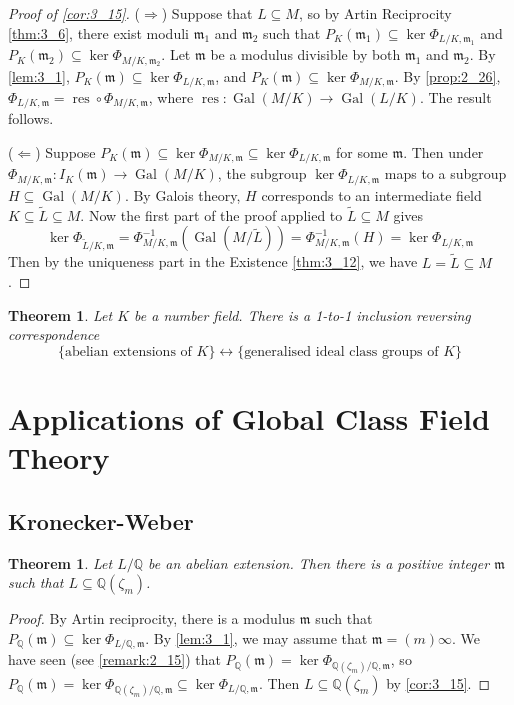 \documentclass[11pt]{article}
\theoremstyle{definition}
\theoremstyle{plain}
\newtheorem{theorem}[definition]{Theorem}
\theoremstyle{remark}
\DeclareMathOperator{\Gal}{Gal}
\DeclareMathOperator{\res}{res}
\newcommand{\QQ}{\mathbb{Q}}
\newcommand{\fm}{\mathfrak{m}}
\begin{document}
\begin{proof}[Proof of \autoref{cor:3_15}]\phantom{}

    ($\Rightarrow$) Suppose that $L \subseteq M$, so by Artin Reciprocity \autoref{thm:3_6}, there exist moduli $\fm_1$ and $\fm_2$ such that $P_K(\fm_1) \subseteq \ker \Phi_{L/K, \fm_1}$ and $P_K(\fm_2) \subseteq \ker \Phi_{M/K, \fm_2}$. Let $\fm$ be a modulus divisible by both $\fm_1$ and $\fm_2$. By \autoref{lem:3_1}, $P_K(\fm) \subseteq \ker \Phi_{L/K,\fm}$, and $P_K(\fm) \subseteq \ker \Phi_{M/K,\fm}$. By \autoref{prop:2_26}, $\Phi_{L/K, \fm} = \res \circ \Phi_{M/K, \fm}$, where $\res : \Gal(M/K) \to \Gal(L/K)$. The result follows.

    ($\Leftarrow$) Suppose $P_K(\fm) \subseteq \ker \Phi_{M/K, \fm} \subseteq \ker \Phi_{L/K, \fm}$ for some $\fm$. Then under $\Phi_{M/K, \fm} : I_K(\fm) \to \Gal(M/K)$, the subgroup $\ker \Phi_{L/K, \fm}$ maps to a subgroup $H \subseteq \Gal(M/K)$. By Galois theory, $H$ corresponds to an intermediate field $K \subseteq \widetilde{L} \subseteq M$. Now the first part of the proof applied to $\widetilde{L} \subseteq M$ gives
        \begin{equation*}
            \ker \Phi_{\widetilde{L}/K,\fm} = \Phi_{M/K,\fm}^{-1}\left(\Gal(M/\widetilde{L})\right) = \Phi_{M/K,\fm}^{-1}(H) = \ker \Phi_{L/K, \fm}
    \end{equation*}
    Then by the uniqueness part in the Existence \autoref{thm:3_12}, we have $L = \widetilde{L} \subseteq M$.
\end{proof}

\begin{theorem}\label{thm:3_17}
    Let $K$ be a number field. There is a 1-to-1 inclusion reversing correspondence
    \begin{equation*}
        \{\text{abelian extensions of } K\} \longleftrightarrow \{\text{generalised ideal class groups of } K\}
    \end{equation*}
\end{theorem}

\section{Applications of Global Class Field Theory}

\subsection{Kronecker-Weber}

\begin{theorem}\label{thm:4_1}
    Let $L/\QQ$ be an abelian extension. Then there is a positive integer $\fm$ such that $L \subseteq \QQ(\zeta_m)$.
\end{theorem}
\begin{proof}
    By Artin reciprocity, there is a modulus $\fm$ such that $P_\QQ(\fm) \subseteq \ker \Phi_{L/\QQ, \fm}$. By \autoref{lem:3_1}, we may assume that $\fm = (m) \infty$. We have seen (see \autoref{remark:2_15}) that $P_\QQ(\fm) = \ker \Phi_{\QQ(\zeta_m)/\QQ, \fm}$, so $P_\QQ(\fm) = \ker \Phi_{\QQ(\zeta_m)/\QQ, \fm} \subseteq \ker \Phi_{L/\QQ, \fm}$. Then $L \subseteq \QQ(\zeta_m)$ by \autoref{cor:3_15}.
\end{proof}
\end{document}
